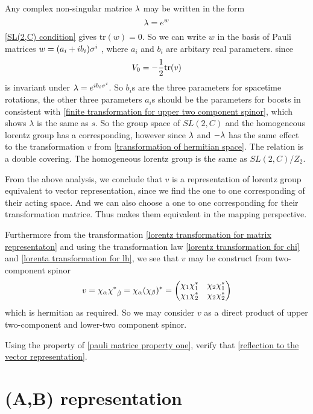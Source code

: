 Any complex non-singular matrice $\lambda$ may be written in the form
\begin{equation}
  \lambda = e^{w}
\end{equation} 
 \eqref{SL(2,C) condition} gives $\text{tr}(w) = 0$. So we can write $w$ in the basis of Pauli matrices $w = (a_i+i b_i)\sigma^{i}$ , where $a_i$ and $b_i$ are arbitary real parameters. since
\begin{equation}
  V_0 = -\frac{1}{2}\text{tr}(v)
\end{equation}
is invariant under $\lambda = e^{i b_i\sigma^{i}}$. So $b_i$s are the three parameters for spacetime rotations, the other three parameters $a_i$s should be the parameters for boosts in consistent with \eqref{finite transformation for upper two component spinor}, which shows $\lambda$ is the same as $s$. So the group space of $SL(2,C)$ and the homogeneous lorentz group has a corresponding, however since $\lambda$ and $-\lambda$ has the same effect to the transformation $v$ from \eqref{transformation of hermitian space}. The relation is a double covering. The homogeneous lorentz group is the same as $SL(2,C)/Z_2$. 

From the above analysis, we conclude that $v$ is a representation of lorentz group equivalent to vector representation, since we find the one to one corresponding of their acting space. And we can also choose a one to one corresponding for their transformation matrice. Thus makes them equivalent in the mapping perspective.

Furthermore from the transformation \eqref{lorentz transformation for matrix representaton} and using the transformation law \eqref{lorentz transformation for chi} and \eqref{lorenta transformation for lh}, we see that $v$ may be construct from two-component spinor
\begin{equation}
v = \chi_\a \lc_{\dob}=\chi_\a(\chi_{\be})^*
=\mqty(\chi_1\chi_1^* & \chi_2\chi_1^*
     \\\chi_1\chi_2^* & \chi_2\chi_2^*)
\end{equation} 
which is hermitian as required. So we may consider $v$ as a direct product of upper two-component and lower-two component spinor.

\begin{Exe}\qquad
	
  Using the property of \eqref{pauli matrice property one}, verify that \eqref{reflection to the vector representation}.
\end{Exe}

\section{(A,B) representation}

